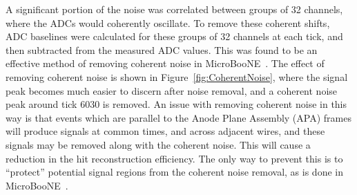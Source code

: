 A significant portion of the noise was correlated between groups of 32 channels, where the ADCs would coherently oscillate. To remove these coherent shifts, ADC baselines were calculated for these groups of 32 channels at each tick, and then subtracted from the measured ADC values. This was found to be an effective method of removing coherent noise in MicroBooNE~\citep{uBooNENoise}. The effect of removing coherent noise is shown in Figure~\ref{fig:CoherentNoise}, where the signal peak becomes much easier to discern after noise removal, and a coherent noise peak around tick 6030 is removed. An issue with removing coherent noise in this way is that events which are parallel to the Anode Plane Assembly (APA) frames will produce signals at common times, and across adjacent wires, and these signals may be removed along with the coherent noise. This will cause a reduction in the hit reconstruction efficiency. The only way to prevent this is to ``protect'' potential signal regions from the coherent noise removal, as is done in MicroBooNE~\citep{uBooNENoise}. \\

